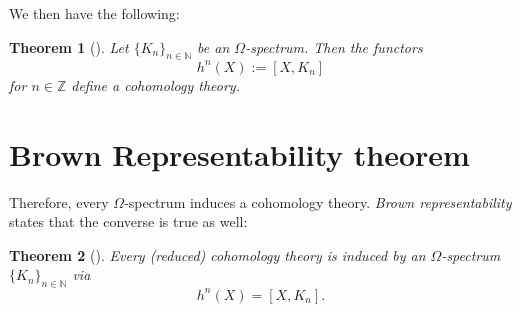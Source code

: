 \documentclass[12pt,a4paper]{amsart}
\theoremstyle{plain}
\newtheorem{thm}{Theorem}
\theoremstyle{definition}
\theoremstyle{remark}
\begin{document}
We then have the following:

\begin{thm}[{\cite[Theorem 4.58]{hat02}}]
  Let $\{K_{n}\}_{n \in \mathbb{N}}$ be an $\Omega$-spectrum.
  Then the functors
  \[ h^{n}(X) := [X,K_{n}] \]
  for $n \in \mathbb{Z}$ define a cohomology theory.
\end{thm}

\section{Brown Representability theorem}

Therefore, every $\Omega$-spectrum induces a cohomology theory.
\emph{Brown representability} states that the converse is true as well:

\begin{thm}[{\cite[Theorem 4E.1]{hat02}}]
  Every (reduced) cohomology theory is induced by an $\Omega$-spectrum $\{ K_{n} \}_{n \in \mathbb{N}}$ via
  \[ h^{n}(X) = [X, K_{n}]. \]
\end{thm}

\printbibliography
\vfill
\end{document}
